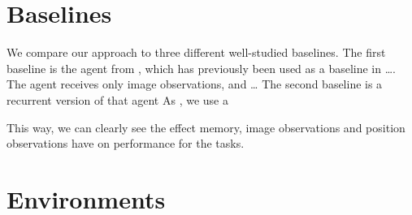 








\section{Baselines}
\label{sec:baseline}

We compare our approach to three different well-studied baselines.
The first baseline is the agent from \cite{mnih_human_2015}, which has previously been used as a baseline in \dots.
The agent receives only image observations, and \dots
The second baseline is a recurrent version of that agent
As \cite{mirowski_navigate_2017}, we use a 

This way, we can clearly see the effect memory, image observations and position observations have on performance for the tasks.

\section{Environments}
\label{sec:environments}

